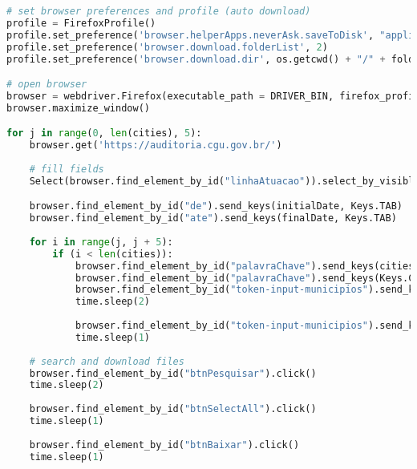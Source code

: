 \begin{lstlisting}[language=Python]
# set browser preferences and profile (auto download)
profile = FirefoxProfile()
profile.set_preference('browser.helperApps.neverAsk.saveToDisk', "application/pdf,application/zip")
profile.set_preference('browser.download.folderList', 2)
profile.set_preference('browser.download.dir', os.getcwd() + "/" + folder)

# open browser
browser = webdriver.Firefox(executable_path = DRIVER_BIN, firefox_profile = profile)
browser.maximize_window()

for j in range(0, len(cities), 5):
    browser.get('https://auditoria.cgu.gov.br/')
    
    # fill fields
    Select(browser.find_element_by_id("linhaAtuacao")).select_by_visible_text('Fiscalização em Entes Federativos - Municípios')

    browser.find_element_by_id("de").send_keys(initialDate, Keys.TAB)
    browser.find_element_by_id("ate").send_keys(finalDate, Keys.TAB)
    
    for i in range(j, j + 5):
        if (i < len(cities)):
            browser.find_element_by_id("palavraChave").send_keys(cities[i], Keys.COMMAND, 'a')
            browser.find_element_by_id("palavraChave").send_keys(Keys.COMMAND, 'x')
            browser.find_element_by_id("token-input-municipios").send_keys(Keys.COMMAND, 'v')
            time.sleep(2)
            
            browser.find_element_by_id("token-input-municipios").send_keys(Keys.ENTER)
            time.sleep(1)
    
    # search and download files
    browser.find_element_by_id("btnPesquisar").click()
    time.sleep(2)
    
    browser.find_element_by_id("btnSelectAll").click()
    time.sleep(1)
    
    browser.find_element_by_id("btnBaixar").click()
    time.sleep(1)
\end{lstlisting}

